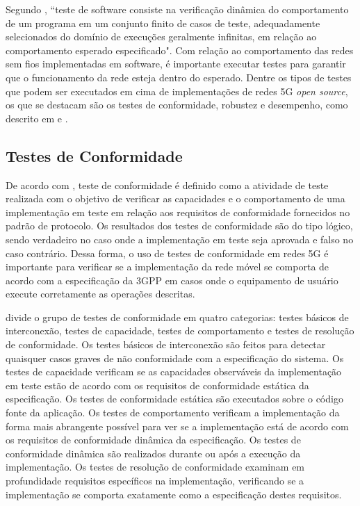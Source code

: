 Segundo \cite[p.~2, tradução nossa]{Bertolino2003}, ``teste de software consiste na verificação dinâmica do comportamento de um programa em um conjunto finito de casos de teste, adequadamente selecionados do domínio de execuções geralmente infinitas, em relação ao comportamento esperado especificado".
Com relação ao comportamento das redes sem fios implementadas em software, é importante executar testes para garantir que o funcionamento da rede esteja dentro do esperado.
Dentre os tipos de testes que podem ser executados em cima de implementações de redes 5G \textit{open source}, os que se destacam são os testes de conformidade, robustez e desempenho, como descrito em \cite{Dominato2021} e \cite{Zhang2019ASO}.

\subsection{Testes de Conformidade}

De acordo com \cite{Sarikaya1989}, teste de conformidade é definido como a atividade de teste realizada com o objetivo de verificar as capacidades e o comportamento de uma implementação em teste em relação aos requisitos de conformidade fornecidos no padrão de protocolo.
Os resultados dos testes de conformidade são do tipo lógico, sendo verdadeiro no caso onde a implementação em teste seja aprovada e falso no caso contrário.
Dessa forma, o uso de testes de conformidade em redes 5G é importante para verificar se a implementação da rede móvel se comporta de acordo com a especificação da 3GPP em casos onde o equipamento de usuário execute corretamente as operações descritas.

\cite{Rayner1987} divide o grupo de testes de conformidade em quatro categorias: testes básicos de interconexão, testes de capacidade, testes de comportamento e testes de resolução de conformidade.
Os testes básicos de interconexão são feitos para detectar quaisquer casos graves de não conformidade com a especificação do sistema.
Os testes de capacidade verificam se as capacidades observáveis da implementação em teste estão de acordo com os requisitos de conformidade estática da especificação. Os testes de conformidade estática são executados sobre o código fonte da aplicação.
Os testes de comportamento verificam a implementação da forma mais abrangente possível para ver se a implementação está de acordo com os requisitos de conformidade dinâmica da especificação. Os testes de conformidade dinâmica são realizados durante ou após a execução da implementação.
Os testes de resolução de conformidade examinam em profundidade requisitos específicos na implementação, verificando se a implementação se comporta exatamente como a especificação destes requisitos.

